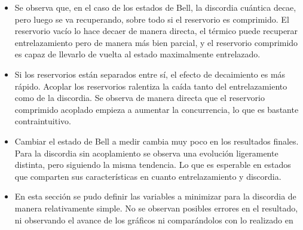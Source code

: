 \documentclass{book}
\begin{document}
\begin{itemize}
    \item Se observa que, en el caso de los estados de Bell, la discordia cuántica decae, pero luego se va recuperando, sobre todo si el reservorio es comprimido. El reservorio vacío lo hace decaer de manera directa, el térmico puede recuperar entrelazamiento pero de manera más bien parcial, y el reservorio comprimido es capaz de llevarlo de vuelta al estado maximalmente entrelazado.
    \item Si los reservorios están separados entre sí, el efecto de decaimiento es más rápido. Acoplar los reservorios ralentiza la caída tanto del entrelazamiento como de la discordia. Se observa de manera directa que el reservorio comprimido acoplado empieza a aumentar la concurrencia, lo que es bastante contraintuitivo. 
    \item Cambiar el estado de Bell a medir cambia muy poco en los resultados finales. Para la discordia sin acoplamiento se observa una evolución ligeramente distinta, pero siguiendo la misma tendencia. Lo que es esperable en estados que comparten sus características en cuanto entrelazamiento y discordia.
    \item En esta sección se pudo definir las variables a minimizar para la discordia de manera relativamente simple. No se observan posibles errores en el resultado, ni observando el avance de los gráficos ni comparándolos con lo realizado en \cite{Method2}
\end{itemize}
\end{document}
